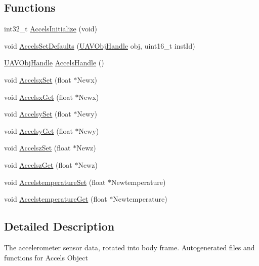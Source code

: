 \subsection*{\-Functions}
\begin{DoxyCompactItemize}
\item 
int32\-\_\-t \hyperlink{group___accels_ga3e61bb343e93612ddb5280736a1baad1}{\-Accels\-Initialize} (void)
\item 
void \hyperlink{group___accels_gaa5e01e8c3e172ff3360ea3601176a139}{\-Accels\-Set\-Defaults} (\hyperlink{targets_2_u_a_v_objects_2inc_2uavobjectmanager_8h_a279053e22be53ce9f895043aaeb91e3b}{\-U\-A\-V\-Obj\-Handle} obj, uint16\-\_\-t inst\-Id)
\item 
\hyperlink{targets_2_u_a_v_objects_2inc_2uavobjectmanager_8h_a279053e22be53ce9f895043aaeb91e3b}{\-U\-A\-V\-Obj\-Handle} \hyperlink{group___accels_ga71ed1a9a06bfe627b8eb3f5f9ba11b7d}{\-Accels\-Handle} ()
\item 
void \hyperlink{group___accels_ga8fa3d88253a9f105f64e92a3b09126cd}{\-Accelsx\-Set} (float $\ast$\-Newx)
\item 
void \hyperlink{group___accels_gaf14e4358d6336486d812854df8205221}{\-Accelsx\-Get} (float $\ast$\-Newx)
\item 
void \hyperlink{group___accels_ga2e4acc7901b4f61567da2d6cca45b6dc}{\-Accelsy\-Set} (float $\ast$\-Newy)
\item 
void \hyperlink{group___accels_ga5fc4604939eeab54141e291e2c96a4be}{\-Accelsy\-Get} (float $\ast$\-Newy)
\item 
void \hyperlink{group___accels_ga5355d475f6fc89544d6efd90fcb5a1a0}{\-Accelsz\-Set} (float $\ast$\-Newz)
\item 
void \hyperlink{group___accels_gadb42b997cb39a5cd0a52e5ff7281b716}{\-Accelsz\-Get} (float $\ast$\-Newz)
\item 
void \hyperlink{group___accels_ga2872728c2bb539420f4ddc0d2d315363}{\-Accelstemperature\-Set} (float $\ast$\-Newtemperature)
\item 
void \hyperlink{group___accels_ga588a6b91be0779500d571e81c680921a}{\-Accelstemperature\-Get} (float $\ast$\-Newtemperature)
\end{DoxyCompactItemize}


\subsection{\-Detailed \-Description}
\-The accelerometer sensor data, rotated into body frame. \-Autogenerated files and functions for \-Accels \-Object 

